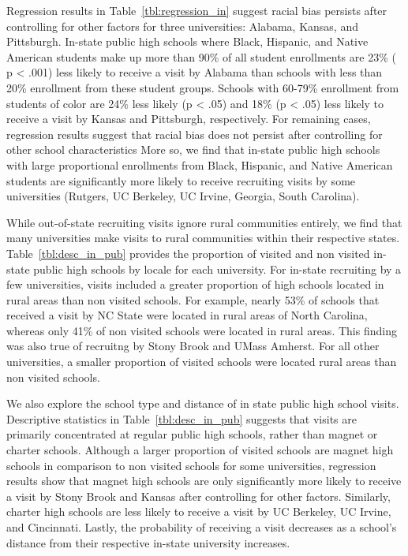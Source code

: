 \documentclass[twoside]{article}
\begin{document}
Regression results in Table~\ref{tbl:regression_in} suggest racial bias persists after controlling for other factors for three universities: Alabama, Kansas, and Pittsburgh. In-state public high schools where Black, Hispanic, and Native American students make up more than  90\% of all student enrollments are 23\% ( p < .001) less likely to receive a visit by Alabama than schools with less than 20\% enrollment from these student groups. Schools with 60-79\% enrollment from students of color are 24\% less likely (p < .05) and 18\% (p < .05) less likely to receive a visit by Kansas and Pittsburgh, respectively. For remaining cases, regression results suggest that racial bias does not persist after controlling for other school characteristics More so, we find that in-state public high schools with large proportional enrollments from Black, Hispanic, and Native American students are significantly more likely to receive recruiting visits by some universities (Rutgers, UC Berkeley, UC Irvine, Georgia, South Carolina).

While out-of-state recruiting visits ignore rural communities entirely, we find that many universities make visits to rural communities within their respective states. Table~\ref{tbl:desc_in_pub} provides the proportion of visited and non visited in-state public high schools by locale for each university. For in-state recruiting by a few universities, visits included a greater proportion of high schools located in rural areas than non visited schools. For example, nearly 53\% of schools that received a visit by NC State were located in rural areas of North Carolina, whereas only 41\% of non visited schools were located in rural areas. This finding was also true of recruitng by Stony Brook and UMass Amherst. For all other universities, a smaller proportion of visited schools were located rural areas than non visited schools.

We also explore the school type and distance of in state public high school visits. Descriptive statistics in Table~\ref{tbl:desc_in_pub} suggests that visits are primarily concentrated at regular public high schools, rather than magnet or charter schools. Although a larger proportion of visited schools are magnet high schools in comparison to non visited schools for some universities, regression results show that magnet high schools are only significantly more likely to receive a visit by Stony Brook and Kansas after controlling for other factors. Similarly, charter high schools are less likely to receive a visit by UC Berkeley, UC Irvine, and Cincinnati.  Lastly, the probability of receiving a visit decreases as a school’s distance from their respective in-state university increases.
\end{document}
